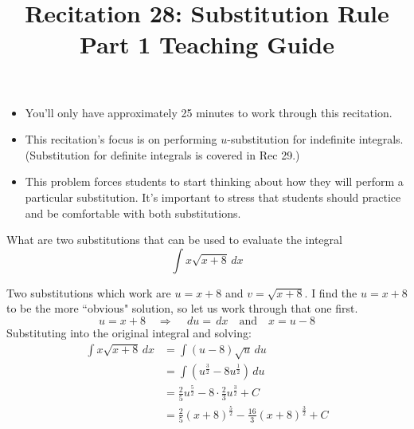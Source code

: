 \documentclass[nooutcomes, handout]{ximera}
\title{Recitation 28: Substitution Rule Part 1 Teaching Guide}
\renewcommand{\d}{\,d}
\begin{document}
\begin{abstract}		\end{abstract}
\maketitle

\begin{problem}[warmup]
  \mbox{}
  \begin{itemize}
  \item You'll only have approximately 25 minutes to work through this
    recitation.

  \item This recitation's focus is on performing $u$-substitution for
    indefinite integrals. (Substitution for definite integrals is
    covered in Rec 29.)

  \item This problem forces students to start thinking about how they
    will perform a particular substitution. It's important to stress
    that students should practice and be comfortable with both
    substitutions.
  \end{itemize}

  What are two substitutions that can be used to evaluate the integral
  \begin{equation*}
    \int x \sqrt{x+8} \d x
  \end{equation*}
	
		\begin{freeResponse}
                  Two substitutions which work are $u=x+8$ and
                  $v=\sqrt{x+8}$.  I find the $u=x+8$ to be the more
                  ``obvious" solution, so let us work through that one
                  first.
                  \begin{equation*}
                    u=x+8 \quad \Longrightarrow \quad \d u = \d x \quad \text{and} \quad x = u-8
                  \end{equation*}
                  Substituting into the original integral and solving:
                  \begin{align*}
                    \int x \sqrt{x+8} \d x &= \int (u-8) \sqrt{u} \d u  \\
                                           &= \int (u^{\frac{3}{2}} - 8u^{\frac{1}{2}} ) \d u  \\
                                           &= \frac{2}{5} u^{\frac{5}{2}} - 8 \cdot \frac{2}{3} u^{\frac{3}{2}} + C  \\
                                           &= \frac{2}{5} (x+8)^{\frac{5}{2}} - \frac{16}{3} (x+8)^{\frac{3}{2}} + C
                  \end{align*}
		

\end{freeResponse}
\end{problem}
\end{document}
